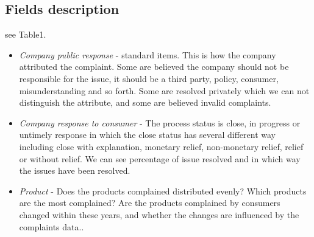 \documentclass[conference]{IEEEtran}
\begin{document}
\subsection{Fields description}\label{AA}
see Table1.
\begin{itemize}
\item \textit{Company public response} - standard items. This is how the company attributed the complaint. Some are believed the company should not be responsible for the issue, it should be a third party, policy, consumer, misunderstanding and so forth. Some are resolved privately which we can not distinguish the attribute, and some are believed invalid complaints.
\item \textit{Company response to consumer} - The process status is close, in progress or untimely response in which the close status has several different way including close with explanation, monetary relief, non-monetary relief, relief or without relief. We can see percentage of issue resolved and in which way the issues have been resolved.  
\item \textit{Product} - Does the products complained distributed evenly? Which products are the most complained? Are the products complained by consumers changed within these years, and whether the changes are influenced by the complaints data..
\end{itemize}
\end{document}

